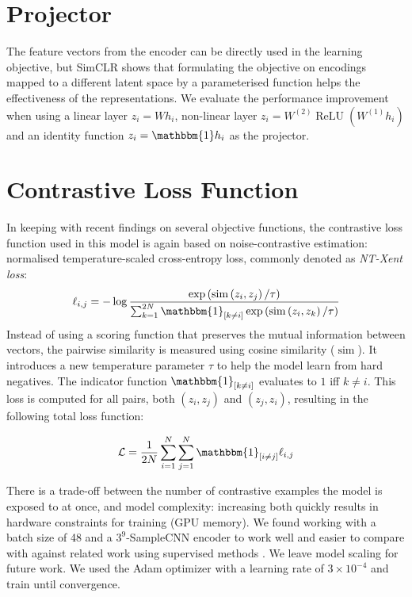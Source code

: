 \documentclass{report}
\begin{document}
\section{Projector}
The feature vectors from the encoder can be directly used in the learning objective, but SimCLR\cite{chen_simple_2020} shows that formulating the objective on encodings mapped to a different latent space by a parameterised function helps the effectiveness of the representations. We evaluate the performance improvement when using a linear layer $z_i = Wh_i$, non-linear layer $z_i = W^{(2)}\operatorname{ReLU}(W^{(1)}h_i)$ and an identity function $z_i = \mathbbm{1}h_i$ as the projector.


\section{Contrastive Loss Function}
In keeping with recent findings on several objective functions\cite{chen_simple_2020}, the contrastive loss function used in this model is again based on noise-contrastive estimation: normalised temperature-scaled cross-entropy loss, commonly denoted as \emph{NT-Xent loss}:
\begin{equation}
    \label{ntxent_loss}
    \ell_{i, j}=-\log \frac{\exp \left(\operatorname{sim}\left(z_{i}, z_{j}\right) / \tau\right)}{\sum_{k=1}^{2 N} \mathbbm{1}_{[k \neq i]} \exp \left(\operatorname{sim}\left(z_{i}, z_{k}\right) / \tau\right)}
\end{equation}
Instead of using a scoring function that preserves the mutual information between vectors, the pairwise similarity is measured using cosine similarity ($\operatorname{sim}$).
It introduces a new temperature parameter $\tau$ to help the model learn from hard negatives. The indicator function $\mathbbm{1}_{[k \neq i]}$ evaluates to $1$ iff $k\neq i$.
This loss is computed for all pairs, both $(z_i, z_j)$ and $(z_j, z_i)$, resulting in the following total loss function:

\begin{equation}
    \label{total_xent_loss}
    \mathcal{L} = \frac{1}{2N}\sum_{i=1}^{N}\sum_{j=1}^{N} \mathbbm{1}_{[i\neq j]}\ell_{i, j}
\end{equation}

There is a trade-off between the number of contrastive examples the model is exposed to at once, and model complexity: increasing both quickly results in hardware constraints for training (GPU memory). We found working with a batch size of 48 and a $3^9$-SampleCNN encoder to work well and easier to compare with against related work using supervised methods \cite{lee2018samplecnn, dieleman2014end,pons_end--end_2017}. We leave model scaling for future work. We used the Adam optimizer \cite{adam_optimizer} with a learning rate of $3\times10^{-4}$ and train until convergence.
\end{document}
